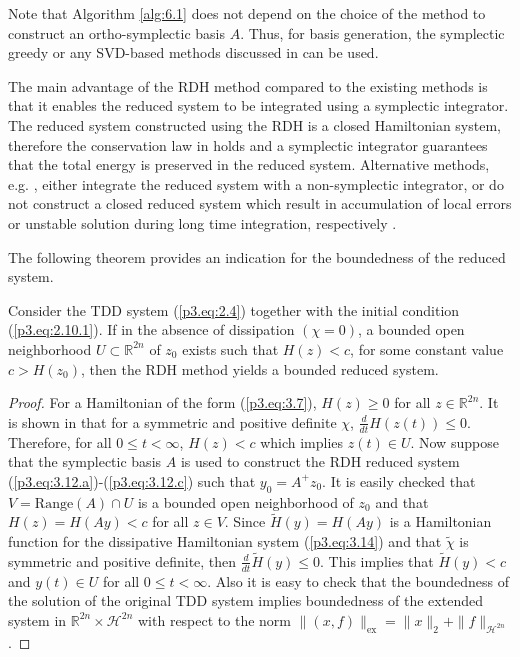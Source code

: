 Note that Algorithm \ref{alg:6.1} does not depend on the choice of the method to construct an ortho-symplectic basis $A$. Thus, for basis generation, the symplectic greedy or any SVD-based methods discussed in  can be used.

The main advantage of the RDH method compared to the existing methods is that it enables the reduced system to be integrated using a symplectic integrator. The reduced system constructed using the RDH is a closed Hamiltonian system, therefore the conservation law in  holds and a symplectic integrator guarantees that the total energy is preserved in the reduced system. Alternative methods, e.g. \cite{peng2016geometric,polyuga2010structure,beattie2011structure}, either integrate the reduced system with a non-symplectic integrator, or do not construct a closed reduced system which result in accumulation of local errors or unstable solution during long time integration, respectively \cite{hairer2006geometric}.

The following theorem provides an indication for the boundedness of the reduced system.
\begin{theorem}
Consider the TDD system (\ref{p3.eq:2.4}) together with the initial condition (\ref{p3.eq:2.10.1}). If in the absence of dissipation $(\chi = 0)$, a bounded open neighborhood $U\subset \mathbb R^{2n}$ of $z_0$ exists such that $H(z)<c$, for some constant value $c > H(z_0)$, then the RDH method yields a bounded reduced system.
\end{theorem}
\begin{proof} For a Hamiltonian of the form (\ref{p3.eq:3.7}), $H(z)\geq 0$ for all $z\in \mathbb R^{2n}$. It is shown in \cite{figotin2007hamiltonian,figotin2005spectral} that for a symmetric and positive definite $\chi$, $\frac d {dt} H(z(t)) \leq 0$. Therefore, for all $0\leq t <\infty$, $H(z) < c$ which implies $z(t) \in U$. Now suppose that the symplectic basis $A$ is used to construct the RDH reduced system (\ref{p3.eq:3.12.a})-(\ref{p3.eq:3.12.c}) such that $y_0 = A^+z_0$. It is easily checked that $V = \text{Range}(A)\cap U$ is a bounded open neighborhood of $z_0$ and that $H(z) = H(Ay) < c$ for all $z \in V$. Since $\tilde H(y) = H(Ay)$ is a Hamiltonian function for the dissipative Hamiltonian system (\ref{p3.eq:3.14}) and that $\tilde \chi$ is symmetric and positive definite, then $\frac d {dt} \tilde H(y) \leq0$. This implies that $\tilde H(y)<c$ and $y(t)\in U$ for all $0\leq t <\infty$. Also it is easy to check that the boundedness of the solution of the original TDD system implies boundedness of the extended system in $\mathbb R^{2n}\times \mathcal H^{2n}$ with respect to the norm $\| (x,f) \|_{\text{ex}} = \|x\|_2 + \| f \|_{\mathcal H ^{2n}}$.
\end{proof}


